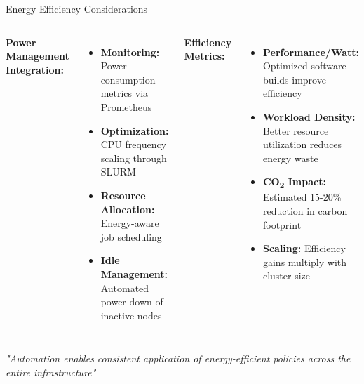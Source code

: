 \documentclass[aspectratio=169]{beamer}
\begin{document}
\begin{frame}{Energy Efficiency Considerations}
  \begin{columns}
    \textbf{Power Management Integration:}
    \begin{itemize}
      \item \textbf{Monitoring:} Power consumption metrics via Prometheus
      \item \textbf{Optimization:} CPU frequency scaling through SLURM
      \item \textbf{Resource Allocation:} Energy-aware job scheduling
      \item \textbf{Idle Management:} Automated power-down of inactive nodes
    \end{itemize}
    
    \textbf{Efficiency Metrics:}
    \begin{itemize}
      \item \textbf{Performance/Watt:} Optimized software builds improve efficiency
      \item \textbf{Workload Density:} Better resource utilization reduces energy waste
      \item \textbf{CO\textsubscript{2} Impact:} Estimated 15-20\% reduction in carbon footprint
      \item \textbf{Scaling:} Efficiency gains multiply with cluster size
    \end{itemize}
  \end{columns}
  
  \vspace{0.3cm}
  \begin{center}
    \textit{"Automation enables consistent application of energy-efficient policies across the entire infrastructure"}
  \end{center}
\end{frame}
\end{document}
